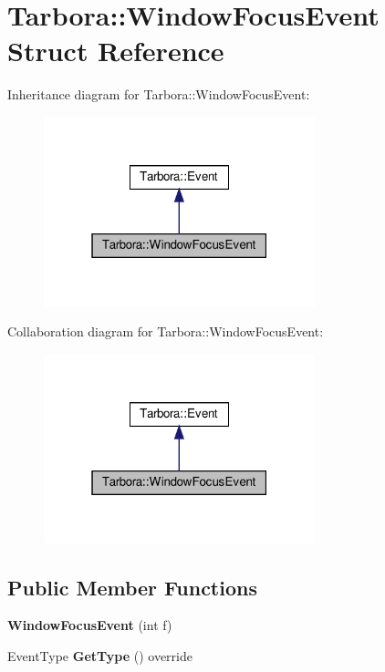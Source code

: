 \hypertarget{structTarbora_1_1WindowFocusEvent}{}\section{Tarbora\+:\+:Window\+Focus\+Event Struct Reference}
\label{structTarbora_1_1WindowFocusEvent}


Inheritance diagram for Tarbora\+:\+:Window\+Focus\+Event\+:\nopagebreak
\begin{figure}[H]
\begin{center}
\leavevmode
\includegraphics[width=223pt]{structTarbora_1_1WindowFocusEvent__inherit__graph}
\end{center}
\end{figure}


Collaboration diagram for Tarbora\+:\+:Window\+Focus\+Event\+:\nopagebreak
\begin{figure}[H]
\begin{center}
\leavevmode
\includegraphics[width=223pt]{structTarbora_1_1WindowFocusEvent__coll__graph}
\end{center}
\end{figure}
\subsection*{Public Member Functions}
\begin{DoxyCompactItemize}
\item 
\mbox{\label{structTarbora_1_1WindowFocusEvent_a809cd60c5a9857d343f9b65e1fab2309}} 
{\bfseries Window\+Focus\+Event} (int f)
\item 
\mbox{\label{structTarbora_1_1WindowFocusEvent_a1cacbc3837b8f9fabfab97442fe5afc1}} 
Event\+Type {\bfseries Get\+Type} () override
\end{DoxyCompactItemize}
